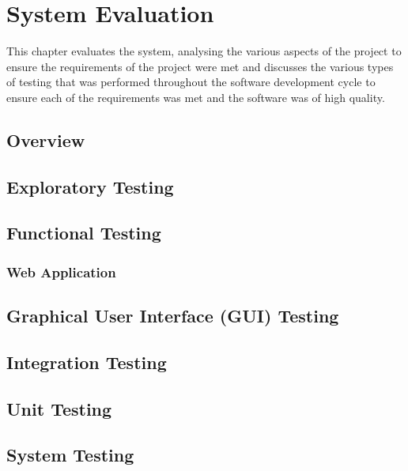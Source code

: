 \chapter{System Evaluation}
This chapter evaluates the system, analysing the various aspects of the project to ensure the requirements of the project were met and discusses the various types of testing that was performed throughout the software development cycle to ensure each of the requirements was met and the software was of high quality. 

\section{Overview}


\section{Exploratory Testing}


\section{Functional Testing}

\subsection{Web Application}


\section{Graphical User Interface (GUI) Testing}


\section{Integration Testing}


\section{Unit Testing}


\section{System Testing}
